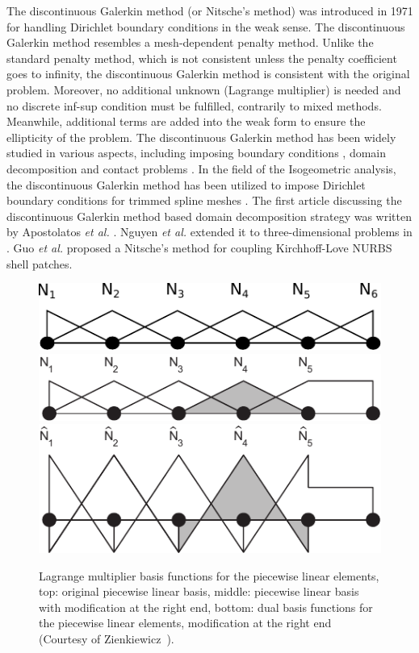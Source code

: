 The discontinuous Galerkin method (or Nitsche's method) was introduced in 1971 \cite{nitsche_uber_1971} for handling Dirichlet boundary conditions in the weak sense. The discontinuous Galerkin method resembles a mesh-dependent penalty method. Unlike the standard penalty method, which is not consistent unless the penalty coefficient goes to infinity, the discontinuous Galerkin method is consistent with the original problem. Moreover, no additional unknown (Lagrange multiplier) is needed and no discrete inf-sup condition must be fulfilled, contrarily to mixed methods. Meanwhile, additional terms are added into the weak form to ensure the ellipticity of the problem. The discontinuous Galerkin method has been widely studied in various aspects, including imposing boundary conditions \cite{hansbo_nitsches_2005}, domain decomposition \cite{becker_finite_2003} and contact problems \cite{chouly_symmetric_2015}. In the field of the Isogeometric analysis, the discontinuous Galerkin method has been utilized to impose Dirichlet boundary conditions for trimmed spline meshes \cite{embar_imposing_2010}. The first article discussing the discontinuous Galerkin method based domain decomposition strategy was written by Apostolatos \textit{et al.} \cite{apostolatos_nitsche-type_2014}. Nguyen \textit{et al.} extended it to three-dimensional problems in \cite{nguyen_nitsches_2014}. Guo \textit{et al.} \cite{guo_nitsches_2015} proposed a Nitsche's method for coupling Kirchhoff-Love NURBS shell patches.\par

\begin{figure}
  \centering
  \includegraphics[width=.7\linewidth]{original_basis}\\
  \vspace{1em}
  \includegraphics[width=.7\linewidth]{mortar_basis}\\
  \vspace{1em}
  \includegraphics[width=.7\linewidth]{dual_mortar_basis}
  \caption{Lagrange multiplier basis functions for the piecewise linear elements, top: original piecewise linear basis, middle: piecewise linear basis with modification at the right end, bottom: dual basis functions for the piecewise linear elements, modification at the right end (Courtesy of Zienkiewicz~\cite{zienkiewicz1977finite}).}\label{fig:mortar_basis}
\end{figure}

